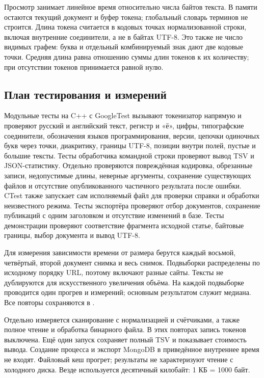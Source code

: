 \documentclass[12pt,a4paper]{article}
\newcommand{\code}[1]{\texttt{\detokenize{#1}}}
\begin{document}
Просмотр занимает линейное время относительно числа байтов текста.
В памяти остаются текущий документ и буфер токена; глобальный словарь
терминов не строится. Длина токена считается в кодовых точках нормализованной
строки, включая внутренние соединители, а не в байтах UTF-8. Это также
не число видимых графем: буква и отдельный комбинируемый знак дают две
кодовые точки. Средняя длина равна отношению суммы длин токенов к их
количеству; при отсутствии токенов принимается равной нулю.

\subsection{План тестирования и измерений}

Модульные тесты на C++ с GoogleTest вызывают токенизатор напрямую
и проверяют русский и английский текст, регистр и «ё», цифры,
типографские соединители, обозначения языков программирования, версии,
цепочки одиночных букв через точки,
диакритику, границы UTF-8, позиции внутри полей,
пустые и большие тексты. Тесты обработчика командной строки проверяют
вывод TSV и JSON-статистику. Отдельно проверяются повреждённая кодировка,
обрезанные записи, недопустимые длины, неверные аргументы, сохранение
существующих файлов и отсутствие опубликованного частичного результата
после ошибки. CTest также запускает сам исполняемый файл для проверки
справки и обработки неизвестного режима. Тесты экспортёра проверяют отбор документов, сохранение
публикаций с одним заголовком и отсутствие изменений в базе. Тесты
демонстрации проверяют соответствие фрагмента исходной статье,
байтовые границы, выбор документа и вывод UTF-8.

Для измерения зависимости времени от размера берутся каждый восьмой,
четвёртый, второй документ снимка и весь снимок. Подвыборки распределены
по исходному порядку URL, поэтому включают разные сайты. Тексты не
дублируются для искусственного увеличения объёма. На каждой подвыборке
проводится один прогрев и \BenchmarkRuns{} измерений; основным результатом
служит медиана. Все повторы сохраняются в \code{benchmark.json}.

Отдельно измеряется сканирование с нормализацией и счётчиками, а также
полное чтение и обработка бинарного файла. В этих повторах запись токенов
выключена. Ещё один запуск сохраняет полный TSV и показывает стоимость
вывода. Создание процесса и экспорт MongoDB в приведённое внутреннее
время не входят. Файловый кеш прогрет; результаты не характеризуют чтение
с холодного диска. Везде используется десятичный килобайт: 1 КБ = 1000 байт.
\end{document}
